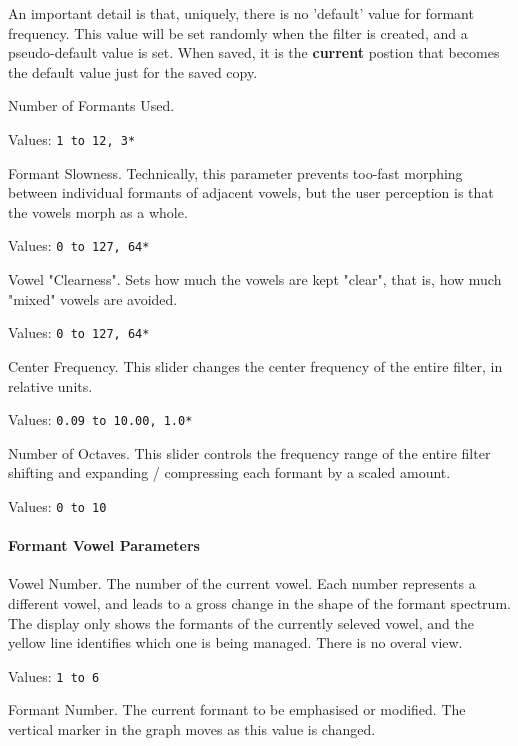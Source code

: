    An important detail is that, uniquely, there is no 'default' value for
   formant frequency. This value will be set randomly when the filter
   is created, and a pseudo-default value is set. When saved, it is the
   \textbf{current} postion that becomes the default value just for the
   saved copy.

   Number of Formants Used.

   Values:  \texttt{1 to 12, 3*}

   Formant Slowness.
   Technically, this parameter prevents too-fast morphing between
   individual formants of adjacent vowels, but the user perception is
   that the vowels morph as a whole.

   Values:  \texttt{0 to 127, 64*}

   Vowel "Clearness".
   Sets how much the vowels are kept "clear",
   that is, how much "mixed" vowels are avoided.

   Values:  \texttt{0 to 127, 64*}

   Center Frequency.
   This slider changes the center frequency of the entire filter, in relative
   units.

   Values:  \texttt{0.09 to 10.00, 1.0*}

   Number of Octaves.
   This slider controls the frequency range of the entire filter shifting and
   expanding / compressing each formant by a scaled amount.

   Values:  \texttt{0 to 10}

\paragraph{Formant Vowel Parameters}
\label{paragraph:formant_vowel_parameters}

   Vowel Number.
   The number of the current vowel.
   Each number represents a different vowel, and leads to a gross change in the
   shape of the formant spectrum. The display only shows the formants of the
   currently seleved vowel, and the yellow line identifies which one is being
   managed. There is no overal view.

   Values:  \texttt{1 to 6}

   Formant Number.
   The current formant to be emphasised or modified.  The vertical marker in
   the graph moves as this value is changed.

